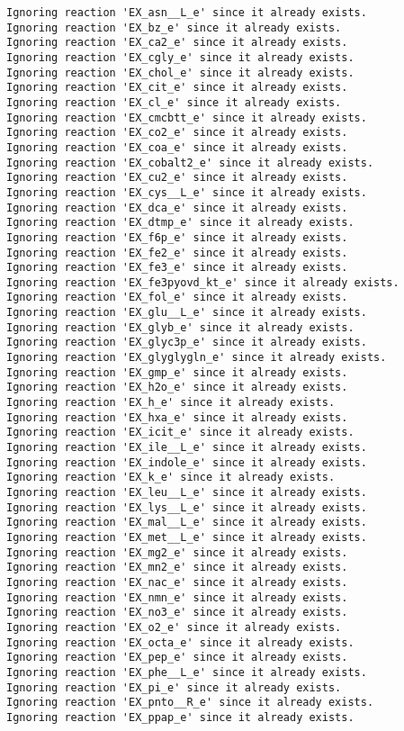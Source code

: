 \documentclass[
  letterpaper,
  DIV=11,
  numbers=noendperiod]{scrartcl}
\begin{document}
\begin{verbatim}
Ignoring reaction 'EX_asn__L_e' since it already exists.
Ignoring reaction 'EX_bz_e' since it already exists.
Ignoring reaction 'EX_ca2_e' since it already exists.
Ignoring reaction 'EX_cgly_e' since it already exists.
Ignoring reaction 'EX_chol_e' since it already exists.
Ignoring reaction 'EX_cit_e' since it already exists.
Ignoring reaction 'EX_cl_e' since it already exists.
Ignoring reaction 'EX_cmcbtt_e' since it already exists.
Ignoring reaction 'EX_co2_e' since it already exists.
Ignoring reaction 'EX_coa_e' since it already exists.
Ignoring reaction 'EX_cobalt2_e' since it already exists.
Ignoring reaction 'EX_cu2_e' since it already exists.
Ignoring reaction 'EX_cys__L_e' since it already exists.
Ignoring reaction 'EX_dca_e' since it already exists.
Ignoring reaction 'EX_dtmp_e' since it already exists.
Ignoring reaction 'EX_f6p_e' since it already exists.
Ignoring reaction 'EX_fe2_e' since it already exists.
Ignoring reaction 'EX_fe3_e' since it already exists.
Ignoring reaction 'EX_fe3pyovd_kt_e' since it already exists.
Ignoring reaction 'EX_fol_e' since it already exists.
Ignoring reaction 'EX_glu__L_e' since it already exists.
Ignoring reaction 'EX_glyb_e' since it already exists.
Ignoring reaction 'EX_glyc3p_e' since it already exists.
Ignoring reaction 'EX_glyglygln_e' since it already exists.
Ignoring reaction 'EX_gmp_e' since it already exists.
Ignoring reaction 'EX_h2o_e' since it already exists.
Ignoring reaction 'EX_h_e' since it already exists.
Ignoring reaction 'EX_hxa_e' since it already exists.
Ignoring reaction 'EX_icit_e' since it already exists.
Ignoring reaction 'EX_ile__L_e' since it already exists.
Ignoring reaction 'EX_indole_e' since it already exists.
Ignoring reaction 'EX_k_e' since it already exists.
Ignoring reaction 'EX_leu__L_e' since it already exists.
Ignoring reaction 'EX_lys__L_e' since it already exists.
Ignoring reaction 'EX_mal__L_e' since it already exists.
Ignoring reaction 'EX_met__L_e' since it already exists.
Ignoring reaction 'EX_mg2_e' since it already exists.
Ignoring reaction 'EX_mn2_e' since it already exists.
Ignoring reaction 'EX_nac_e' since it already exists.
Ignoring reaction 'EX_nmn_e' since it already exists.
Ignoring reaction 'EX_no3_e' since it already exists.
Ignoring reaction 'EX_o2_e' since it already exists.
Ignoring reaction 'EX_octa_e' since it already exists.
Ignoring reaction 'EX_pep_e' since it already exists.
Ignoring reaction 'EX_phe__L_e' since it already exists.
Ignoring reaction 'EX_pi_e' since it already exists.
Ignoring reaction 'EX_pnto__R_e' since it already exists.
Ignoring reaction 'EX_ppap_e' since it already exists.

\end{verbatim}
\end{document}

